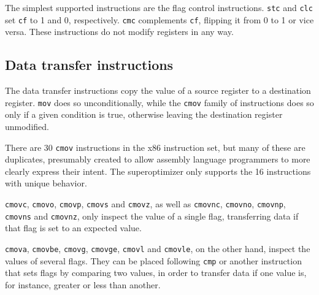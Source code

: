 \documentclass[a4paper,11pt]{kth-mag}
\begin{document}
The simplest supported instructions are the flag control instructions.
\verb|stc| and \verb|clc| set \verb|cf| to 1 and 0, respectively.
\verb|cmc| complements \verb|cf|, flipping it from 0 to 1 or vice versa.
These instructions do not modify registers in any way.

\subsection{Data transfer instructions}

The data transfer instructions copy the value of a source register to a destination register.
\verb|mov| does so unconditionally, while the \verb|cmov| family of instructions does so only if a given condition is true, otherwise leaving the destination register unmodified.

There are 30 \verb|cmov| instructions in the x86 instruction set, but many of these are duplicates, presumably created to allow assembly language programmers to more clearly express their intent.
The superoptimizer only supports the 16 instructions with unique behavior.

\verb|cmovc|, \verb|cmovo|, \verb|cmovp|, \verb|cmovs| and \verb|cmovz|, as well as \verb|cmovnc|, \verb|cmovno|, \verb|cmovnp|, \verb|cmovns| and \verb|cmovnz|, only inspect the value of a single flag, transferring data if that flag is set to an expected value.

\verb|cmova|, \verb|cmovbe|, \verb|cmovg|, \verb|cmovge|, \verb|cmovl| and \verb|cmovle|, on the other hand, inspect the values of several flags.
They can be placed following \verb|cmp| or another instruction that sets flags by comparing two values, in order to transfer data if one value is, for instance, greater or less than another.


\end{document}
